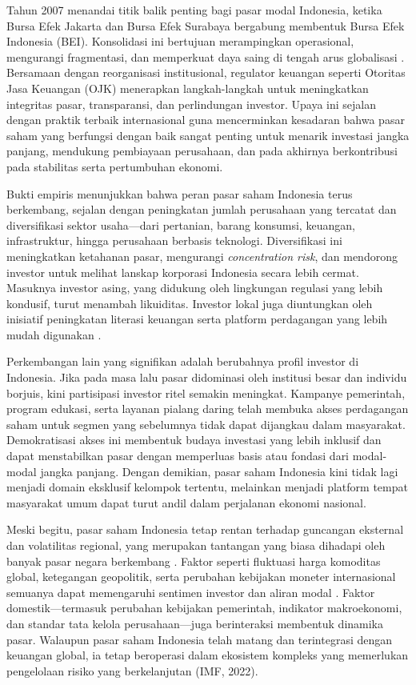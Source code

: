 Tahun 2007 menandai titik balik penting bagi pasar modal Indonesia, ketika Bursa Efek Jakarta dan Bursa Efek Surabaya bergabung membentuk Bursa Efek Indonesia (BEI). Konsolidasi ini bertujuan merampingkan operasional, mengurangi fragmentasi, dan memperkuat daya saing di tengah arus globalisasi \parencite{OJK2007}. Bersamaan dengan reorganisasi institusional, regulator keuangan seperti Otoritas Jasa Keuangan  (OJK) menerapkan langkah-langkah untuk meningkatkan integritas pasar, transparansi, dan perlindungan investor. Upaya ini sejalan dengan praktik terbaik internasional guna mencerminkan kesadaran bahwa pasar saham yang berfungsi dengan baik sangat penting untuk menarik investasi jangka panjang, mendukung pembiayaan perusahaan, dan pada akhirnya berkontribusi pada stabilitas serta pertumbuhan ekonomi.

Bukti empiris menunjukkan bahwa peran pasar saham Indonesia terus berkembang, sejalan dengan peningkatan jumlah perusahaan yang tercatat dan diversifikasi sektor usaha—dari pertanian, barang konsumsi, keuangan, infrastruktur, hingga perusahaan berbasis teknologi. Diversifikasi ini meningkatkan ketahanan pasar, mengurangi \textit{concentration risk}, dan mendorong investor untuk melihat lanskap korporasi Indonesia secara lebih cermat. Masuknya investor asing, yang didukung oleh lingkungan regulasi yang lebih kondusif, turut menambah likuiditas. Investor lokal juga diuntungkan oleh inisiatif peningkatan literasi keuangan serta platform perdagangan yang lebih mudah digunakan \parencite{OECD2018}.

Perkembangan lain yang signifikan adalah berubahnya profil investor di Indonesia. Jika pada masa lalu pasar didominasi oleh institusi besar dan individu borjuis, kini partisipasi investor ritel semakin meningkat. Kampanye pemerintah, program edukasi, serta layanan pialang daring telah membuka akses perdagangan saham untuk segmen yang sebelumnya tidak dapat dijangkau dalam masyarakat. Demokratisasi akses ini membentuk budaya investasi yang lebih inklusif dan dapat menstabilkan pasar dengan memperluas basis atau fondasi dari modal-modal jangka panjang. Dengan demikian, pasar saham Indonesia kini tidak lagi menjadi domain eksklusif kelompok tertentu, melainkan menjadi platform tempat masyarakat umum dapat turut andil dalam perjalanan ekonomi nasional.

Meski begitu, pasar saham Indonesia tetap rentan terhadap guncangan eksternal dan volatilitas regional, yang merupakan tantangan yang biasa dihadapi oleh banyak pasar negara berkembang \parencite{torre2007emerging}. Faktor seperti fluktuasi harga komoditas global, ketegangan geopolitik, serta perubahan kebijakan moneter internasional semuanya dapat memengaruhi sentimen investor dan aliran modal \parencite{BloomEtAl2019}. Faktor domestik—termasuk perubahan kebijakan pemerintah, indikator makroekonomi, dan standar tata kelola perusahaan—juga berinteraksi membentuk dinamika pasar. Walaupun pasar saham Indonesia telah matang dan terintegrasi dengan keuangan global, ia tetap beroperasi dalam ekosistem kompleks yang memerlukan pengelolaan risiko yang berkelanjutan (IMF, 2022).

